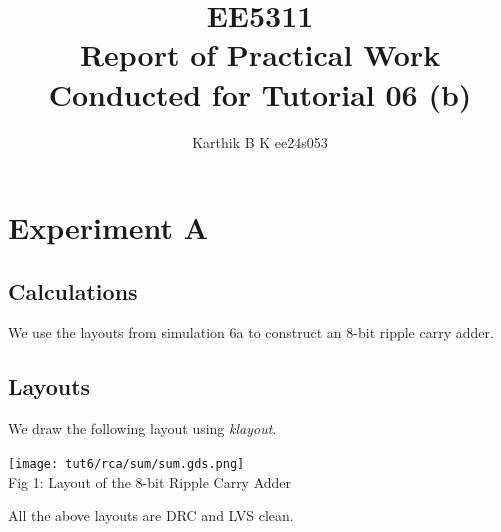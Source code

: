 \documentclass[12pt,a4paper]{article}
\begin{document}
\title{EE5311 \\ Report of Practical Work Conducted for Tutorial 06 (b)}
\author{Karthik B K ee24s053}
\maketitle

\section{Experiment A}
\subsection{Calculations}
\noindent We use the layouts from simulation 6a to construct an 8-bit ripple carry adder.
\subsection{Layouts}
\noindent We draw the following layout using \emph{klayout}.
\begin{center}
\texttt{[image: tut6/rca/sum/sum.gds.png]} \\
Fig 1: Layout of the 8-bit Ripple Carry Adder
\end{center}

\noindent All the above layouts are DRC and LVS clean.
\end{document}
